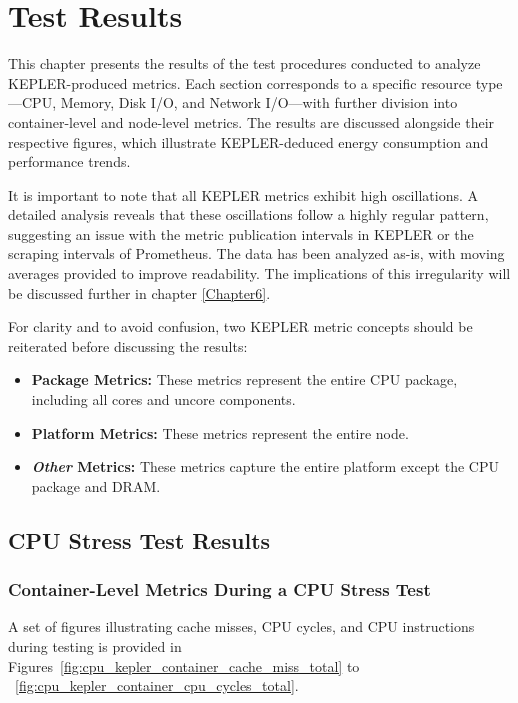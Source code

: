 
\chapter{Test Results}
\label{Chapter5}

This chapter presents the results of the test procedures conducted to analyze KEPLER-produced metrics. Each section corresponds to a specific resource type—CPU, Memory, Disk I/O, and Network I/O—with further division into container-level and node-level metrics. The results are discussed alongside their respective figures, which illustrate KEPLER-deduced energy consumption and performance trends. 

It is important to note that all KEPLER metrics exhibit high oscillations. A detailed analysis reveals that these oscillations follow a highly regular pattern, suggesting an issue with the metric publication intervals in KEPLER or the scraping intervals of Prometheus. The data has been analyzed as-is, with moving averages provided to improve readability. The implications of this irregularity will be discussed further in chapter \ref{Chapter6}.

For clarity and to avoid confusion, two KEPLER metric concepts should be reiterated before discussing the results:
\begin{itemize}
\item \textbf{Package Metrics:} These metrics represent the entire CPU package, including all cores and uncore components.
\item \textbf{Platform Metrics:} These metrics represent the entire node.
\item \textbf{\textit{Other} Metrics:} These metrics capture the entire platform except the CPU package and DRAM.
\end{itemize}

\section{CPU Stress Test Results}

\subsection{Container-Level Metrics During a CPU Stress Test}

A set of figures illustrating cache misses, CPU cycles, and CPU instructions during testing is provided in Figures~\ref{fig:cpu_kepler_container_cache_miss_total} to ~\ref{fig:cpu_kepler_container_cpu_cycles_total}.

